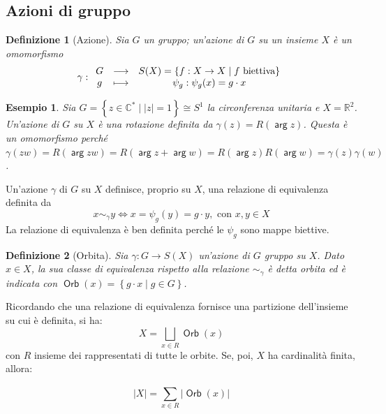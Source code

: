 \documentclass[11pt]{scrartcl}
\theoremstyle{style1}
\newtheorem{definizione}{Definizione}[section]
\newtheorem{esempio}{Esempio}[section]
\newenvironment{boxenv}[1][]{
    \begin{eqbox}[#1]
    }{
   \end{eqbox}
}
\numberwithin{equation}{subsection}
\renewcommand{\operatorname}[1]{\mathop{\mathrm{\textsf{#1}}}}
\begin{document}
\subsection{Azioni di gruppo}
\begin{definizione}
	[Azione]
	Sia $G$ un gruppo; un'azione di $G$ su un insieme $X$ \`e un omomorfismo
	\[
	\gamma : 
	\begin{array}
		{c c c}
		G &\longrightarrow & S(X) = \left\{ f : X \to X  \mid f \text{ biettiva} \right\} \\
		g & \longmapsto & \psi _g : \psi_g(x) = g \cdot x
	\end{array}
	\] 
\end{definizione}
\begin{esempio}
Sia $G = \left\{ z \in \mathbb{C}^*  \mid  \lvert z \rvert =1 \right\} \cong S^1$ la circonferenza unitaria e $X = \mathbb{R}^2$.
Un'azione di $G$ su $X$ \`e una rotazione definita da $\gamma(z) = R(\operatorname{arg} z)$.
Questa \`e un omomorfismo perch\'e $\gamma(zw) = R(\operatorname{arg} zw)  = R(\operatorname{arg} z +  \operatorname{arg} w) = R(\operatorname{arg} z) R(\operatorname{arg} w)= \gamma(z) \gamma(w)$.
\end{esempio}
\noindent Un'azione $\gamma$ di $G$ su $X$ definisce, proprio su $X$, una relazione di equivalenza definita da 
\begin{equation}
	x \sim _\gamma y \iff x=\psi _g(y)=g \cdot y, \text{ con } x,y \in X
\end{equation}
La relazione di equivalenza \`e ben definita perch\'e le $\psi _g$ sono mappe biettive.
\begin{definizione}
	[Orbita]
	Sia $\gamma :G \to S(X)$ un'azione di $G$ gruppo su $X$. Dato $x \in X$, la sua classe di equivalenza rispetto alla relazione $\sim _\gamma$ \`e detta \textit{orbita} ed \`e indicata con $\operatorname{Orb} (x) = \left\{ g \cdot  x  \mid g \in G\right\} $.
\end{definizione}
\noindent Ricordando che una relazione di equivalenza fornisce una partizione dell'insieme su cui \`e definita, si ha:
\begin{equation}
	X = \bigsqcup_{x \in R} \operatorname{Orb} (x)
\end{equation}
con $R$ insieme dei rappresentati di tutte le orbite.
Se, poi, $X$ ha cardinalit\`a finita, allora:
\begin{boxenv}[]
\begin{equation}
	\lvert X \rvert  = \sum_{x \in R}^{} \lvert \operatorname{Orb} (x) \rvert 
\end{equation}
\end{boxenv}
\end{document}
